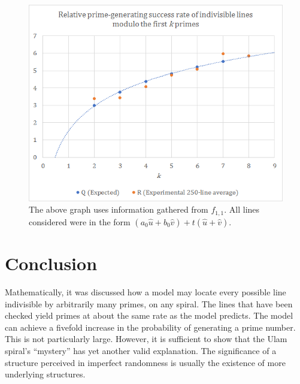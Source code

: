 \documentclass{article}
\begin{document}
\begin{figure}[h!]
	\centering
	\includegraphics{graph}
	\caption{The above graph uses information gathered from \(f_{1,1}\). All lines considered were in the form \((a_0\hat{u}+b_0\hat{v})+t(\hat{u}+\hat{v})\).}
	\label{graph}
\end{figure}

	
	
\section{Conclusion}

Mathematically, it was discussed how a model may locate every possible line indivisible by arbitrarily many primes, on any spiral. The lines that have been checked yield primes at about the same rate as the model predicts. The model can achieve a fivefold increase in the probability of generating a prime number. This is not particularly large. However, it is sufficient to show that the Ulam spiral's ``mystery'' has yet another valid explanation. The significance of a structure perceived in imperfect randomness is usually the existence of more underlying structures.



\newpage
\end{document}
